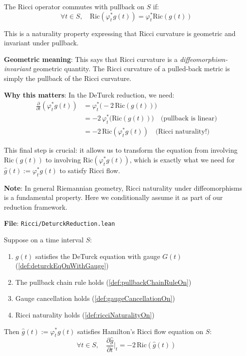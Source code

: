 \begin{definition}
\label{def:ricciNaturalityOn}
The Ricci operator commutes with pullback on $S$ if:
\[ \forall t \in S, \quad \mathrm{Ric}(\varphi_t^* g(t)) = \varphi_t^* \mathrm{Ric}(g(t)) \]

This is a naturality property expressing that Ricci curvature is geometric and invariant under pullback.

\textbf{Geometric meaning}: This says that Ricci curvature is a \emph{diffeomorphism-invariant} geometric quantity. The Ricci curvature of a pulled-back metric is simply the pullback of the Ricci curvature.

\textbf{Why this matters}: In the DeTurck reduction, we need:
\begin{align*}
\frac{\partial}{\partial t}(\varphi_t^* g(t))
&= \varphi_t^*\Big(-2\,\mathrm{Ric}(g(t))\Big) \\
&= -2\, \varphi_t^*\Big(\mathrm{Ric}(g(t))\Big) \quad \text{(pullback is linear)} \\
&= -2\, \mathrm{Ric}(\varphi_t^* g(t)) \quad \text{(Ricci naturality!)}
\end{align*}

This final step is crucial: it allows us to transform the equation from involving $\mathrm{Ric}(g(t))$ to involving $\mathrm{Ric}(\varphi_t^* g(t))$, which is exactly what we need for $\hat{g}(t) := \varphi_t^* g(t)$ to satisfy Ricci flow.

\textbf{Note}: In general Riemannian geometry, Ricci naturality under diffeomorphisms is a fundamental property. Here we conditionally assume it as part of our reduction framework.

\textbf{File}: \texttt{Ricci/DeturckReduction.lean}
\end{definition}

\begin{theorem}
\label{thm:deturck_to_hamilton}
\leanok
{}
Suppose on a time interval $S$:
\begin{enumerate}
\item $g(t)$ satisfies the DeTurck equation with gauge $G(t)$ (\ref{def:deturckEqOnWithGauge})
\item The pullback chain rule holds (\ref{def:pullbackChainRuleOn})
\item Gauge cancellation holds (\ref{def:gaugeCancellationOn})
\item Ricci naturality holds (\ref{def:ricciNaturalityOn})
\end{enumerate}

Then $\hat{g}(t) := \varphi_t^* g(t)$ satisfies Hamilton's Ricci flow equation on $S$:
\[ \forall t \in S, \quad \frac{\partial \hat{g}}{\partial t}\Big|_t = -2 \, \mathrm{Ric}(\hat{g}(t)) \]
\end{theorem}

